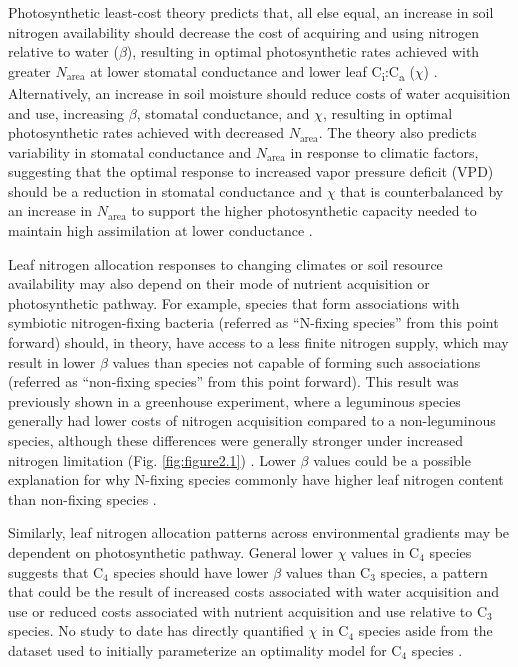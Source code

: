 Photosynthetic least-cost theory predicts that, all else equal, an increase in soil nitrogen availability should decrease the cost of acquiring and using nitrogen relative to water ($\beta$), resulting in optimal photosynthetic rates achieved with greater $N_\mathrm{area}$ at lower stomatal conductance and lower leaf C\textsubscript{i}:C\textsubscript{a} ($\chi$) . Alternatively, an increase in soil moisture should reduce costs of water acquisition and use, increasing $\beta$, stomatal conductance, and $\chi$, resulting in optimal photosynthetic rates achieved with decreased $N_\mathrm{area}$. The theory also predicts variability in stomatal conductance and $N_\mathrm{area}$ in response to climatic factors, suggesting that the optimal response to increased vapor pressure deficit (VPD) should be a reduction in stomatal conductance and $\chi$ that is counterbalanced by an increase in $N_\mathrm{area}$ to support the higher photosynthetic capacity needed to maintain high assimilation at lower conductance .

Leaf nitrogen allocation responses to changing climates or soil resource availability may also depend on their mode of nutrient acquisition or photosynthetic pathway. For example, species that form associations with symbiotic nitrogen-fixing bacteria (referred as “N-fixing species” from this point forward) should, in theory, have access to a less finite nitrogen supply, which may result in lower $\beta$ values than species not capable of forming such associations (referred as “non-fixing species” from this point forward). This result was previously shown in a greenhouse experiment, where a leguminous species generally had lower costs of nitrogen acquisition compared to a non-leguminous species, although these differences were generally stronger under increased nitrogen limitation (Fig. \ref{fig:figure2.1}) . Lower $\beta$ values could be a possible explanation for why N-fixing species commonly have higher leaf nitrogen content than non-fixing species . 

Similarly, leaf nitrogen allocation patterns across environmental gradients may be dependent on photosynthetic pathway. General lower $\chi$ values in C$_4$ species suggests that C$_4$ species should have lower $\beta$ values than C$_3$ species, a pattern that could be the result of increased costs associated with water acquisition and use or reduced costs associated with nutrient acquisition and use relative to C$_3$ species. No study to date has directly quantified $\chi$ in C$_4$ species aside from the dataset used to initially parameterize an optimality model for C$_4$ species .

